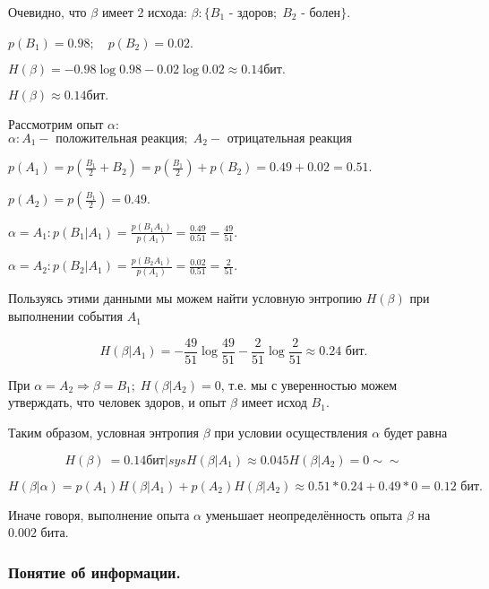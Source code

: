 ﻿\documentclass[a4paper,12pt]{report}
\begin{document}
	 Очевидно, что $\beta$ имеет 2 исхода: $\beta : \{B_1\mbox{ - здоров}; \; B_2\mbox{ - болен}\}$.
	
	$p(B_1) = 0.98; \quad p(B_2) = 0.02$.
	
	$H(\beta) = - 0.98 \log 0.98 - 0.02 \log 0.02 \approx 0.14 \mbox{бит}.$
	
	$H(\beta) \approx 0.14 бит.$
	 
	Рассмотрим опыт $\alpha$: \; $\alpha : {A_1 - \mbox{ положительная реакция}; \; A_2 - \mbox{ отрицательная реакция}}$

	$  p(A_1) = p(\frac{B_1}{2} + B_2) 
	          = p(\frac{B_1}{2}) + p(B_2)
	          = 0.49 + 0.02
	          = 0.51
	$.

	$  p(A_2) = p(\frac{B_1}{2}) 
	          = 0.49
	$.

	$
	  \alpha = A_1 : p(B_1|A_1)
	         = \frac{p(B_1 A_1)}{p(A_1)}
	         = \frac{0.49}{0.51}
	         = \frac{49}{51}.
	$
	
	$
	  \alpha = A_2 : p(B_2|A_1) 
	         = \frac{p(B_2 A_1)}{p(A_1)} 
	         = \frac{0.02}{0.51} 
	         = \frac{2}{51}. 
	$
	
	Пользуясь этими данными мы можем найти условную энтропию $H(\beta)$ при выполнении события $A_1$

	$$
	  H(\beta|A_1) = - \frac{49}{51} \log \frac{49}{51}
	                 - \frac{2}{51}  \log \frac{2}{51}
	         \approx 0.24 \mbox{ бит.}
	$$
	
	При $\alpha = A_2 \Rightarrow \beta = B_1; \; H(\beta|A_2) = 0$, т.е. мы с уверенностью можем утверждать, что человек здоров, и опыт $\beta$ имеет исход $B_1$.
	
	Таким образом, условная энтропия $\beta$ при условии осуществления $\alpha$ будет равна 
	
	$$
	  H(\beta) ~= 0.14 бит | sys 	H(\beta|A_1) \approx 0.045
					H(\beta|A_2) = 0 \sim \sim
	$$
				
	$$
	  H(\beta|\alpha) = p(A_1)H(\beta|A_1) + p(A_2)H(\beta|A_2) 
	            \approx 0.51 * 0.24 + 0.49 * 0
	                  = 0.12 \mbox{ бит.}
	$$
	
	Иначе говоря, выполнение опыта $\alpha$ уменьшает неопределённость опыта $\beta$ на $0.002$ бита.
	
	
	
	\subsubsection{Понятие об информации.}
	
\end{document}
